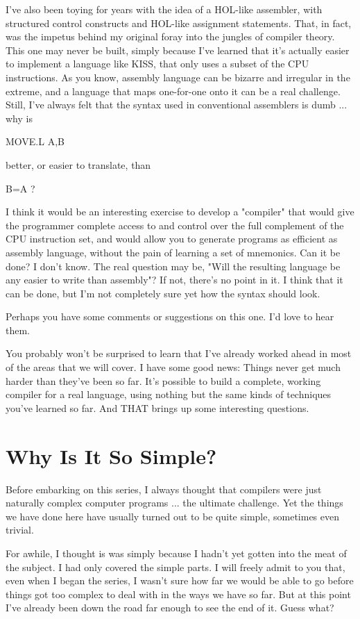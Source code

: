 \documentclass[float=false, crop=false]{standalone}
\begin{document}
\begin{emeration}
I've also been toying for years with the idea of a HOL-like assembler, with
structured control constructs and HOL-like assignment statements. That, in fact,
was the impetus behind my original foray into the jungles of compiler theory.
This one may never be built, simply because I've learned that it's actually
easier to implement a language like KISS, that only uses a subset of the CPU
instructions. As you know, assembly language can be bizarre and irregular in the
extreme, and a language that maps one-for-one onto it can be a real challenge.
Still, I've always felt that the syntax used in conventional assemblers is dumb
... why is

     MOVE.L A,B

better, or easier to translate, than

     B=A ?

I think it would be an interesting exercise to develop a "compiler" that would
give the programmer complete access to and control over the full complement of
the CPU instruction set, and would allow you to generate programs as efficient
as assembly language, without the pain of learning a set of mnemonics. Can it be
done? I don't know. The real question may be, "Will the resulting language be
any easier to write than assembly"? If not, there's no point in it. I think that
it can be done, but I'm not completely sure yet how the syntax should look.

Perhaps you have some comments or suggestions on this one. I'd love to hear
them.

You probably won't be surprised to learn that I've already worked ahead in most
of the areas that we will cover. I have some good news: Things never get much
harder than they've been so far. It's possible to build a complete, working
compiler for a real language, using nothing but the same kinds of techniques
you've learned so far. And THAT brings up some interesting questions.


\section{Why Is It So Simple?}

Before embarking on this series, I always thought that compilers were just
naturally complex computer programs ... the ultimate challenge. Yet the things
we have done here have usually turned out to be quite simple, sometimes even
trivial.

For awhile, I thought is was simply because I hadn't yet gotten into the meat of
the subject. I had only covered the simple parts. I will freely admit to you
that, even when I began the series, I wasn't sure how far we would be able to go
before things got too complex to deal with in the ways we have so far. But at
this point I've already been down the road far enough to see the end of it.
Guess what?



\end{emeration}
\end{document}
